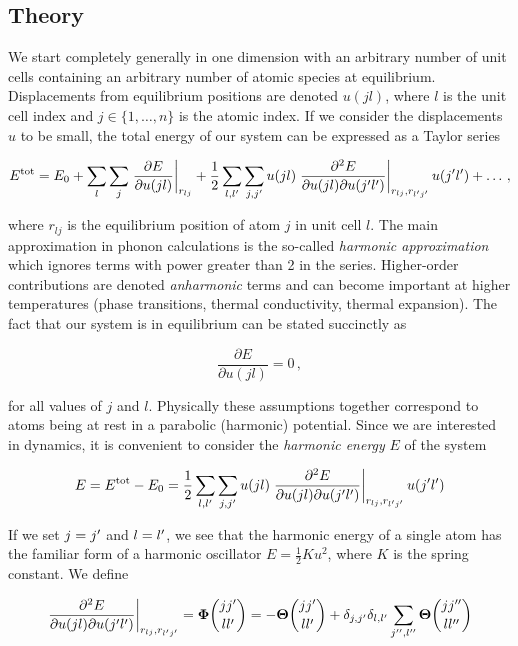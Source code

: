 \subsection{Theory}
We start completely generally in one dimension with an arbitrary number of unit cells containing an arbitrary number of atomic species at equilibrium. Displacements from equilibrium positions are denoted $u(jl)$, where $l$ is the unit cell index and $j \in \{1,\dots,n\}$ is the atomic index. If we consider the displacements $u$ to be small, the total energy of our system can be expressed as a Taylor series

\[ E^\text{tot} = E_0 + \sum_{l}\sum_{j} \left. \frac{\partial E}{\partial u(jl)} \right\rvert_{r_{lj}}  + \frac{1}{2} \sum_{l,l^\prime} \sum_{j,j^\prime} u(jl) \left. \frac{\partial ^2 E}{\partial u(jl) \partial u(j^\prime l^\prime)} \right\rvert_{r_{lj}, r_{l^\prime j^\prime}} u(j^\prime l^\prime) + \dots \, , \]

\noindent where $r_{lj}$ is the equilibrium position of atom $j$ in unit cell $l$. The main approximation in phonon calculations is the so-called \emph{harmonic approximation} which ignores terms with power greater than 2 in the series. Higher-order contributions are denoted \emph{anharmonic} terms and can become important at higher temperatures (phase transitions, thermal conductivity, thermal expansion). The fact that our system is in equilibrium can be stated succinctly as

\[ \frac{\partial E}{\partial u(jl)} = 0 \, , \]

\noindent for all values of $j$ and $l$. Physically these assumptions together correspond to atoms being at rest in a parabolic (harmonic) potential. Since we are interested in  dynamics, it is convenient to consider the \emph{harmonic energy} $E$ of the system

\begin{equation}
E = E^\text{tot} - E_0 = \frac{1}{2} \sum_{l,l^\prime} \sum_{j,j^\prime} u(jl) \left. \frac{\partial ^2 E}{\partial u(jl) \partial u(j^\prime l^\prime)} \right\rvert_{r_{lj}, r_{l^\prime j^\prime}} u(j^\prime l^\prime) \label{eq:eharm}
\end{equation}

\noindent If we set $j=j^\prime$ and $l=l^\prime$, we see that the harmonic energy of a single atom has the familiar form of a harmonic oscillator $E=\frac{1}{2}Ku^2$, where $K$ is the spring constant. We define

\[ \left. \frac{\partial ^2 E}{\partial u(jl) \partial u(\jp \lp)} \right\rvert_{r_{lj}, r_{\lp \jp}} = \fc = \fcbf \]

